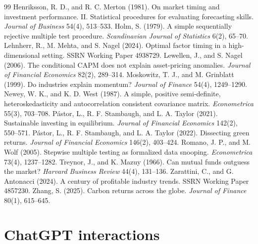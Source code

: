 \begin{thebibliography}{99}
 Henriksson, R. D., and R. C. Merton (1981). On market timing and investment performance. II. Statistical procedures for evaluating forecasting skills. \textit{Journal of Business} 54(4), 513--533.
 Holm, S. (1979). A simple sequentially rejective multiple test procedure. \textit{Scandinavian Journal of Statistics} 6(2), 65--70.
 Lehnherr, R., M. Mehta, and S. Nagel (2024). Optimal factor timing in a high-dimensional setting. SSRN Working Paper 4938729.
 Lewellen, J., and S. Nagel (2006). The conditional CAPM does not explain asset-pricing anomalies. \textit{Journal of Financial Economics} 82(2), 289--314.
 Moskowitz, T. J., and M. Grinblatt (1999). Do industries explain momentum? \textit{Journal of Finance} 54(4), 1249--1290.
 Newey, W. K., and K. D. West (1987). A simple, positive semi-definite, heteroskedasticity and autocorrelation consistent covariance matrix. \textit{Econometrica} 55(3), 703--708.
 P\'astor, L., R. F. Stambaugh, and L. A. Taylor (2021). Sustainable investing in equilibrium. \textit{Journal of Financial Economics} 142(2), 550--571.
 P\'astor, L., R. F. Stambaugh, and L. A. Taylor (2022). Dissecting green returns. \textit{Journal of Financial Economics} 146(2), 403--424.
 Romano, J. P., and M. Wolf (2005). Stepwise multiple testing as formalized data snooping. \textit{Econometrica} 73(4), 1237--1282.
 Treynor, J., and K. Mazuy (1966). Can mutual funds outguess the market? \textit{Harvard Business Review} 44(4), 131--136.
 Zarattini, C., and G. Antonacci (2024). A century of profitable industry trends. SSRN Working Paper 4857230.
 Zhang, S. (2025). Carbon returns across the globe. \textit{Journal of Finance} 80(1), 615--645.
\end{thebibliography}

\clearpage
\appendix
{}
\renewcommand{\runningtitle}{Read the Label: Appendices}

\section{ChatGPT interactions}
\label{app:chatgpt}

